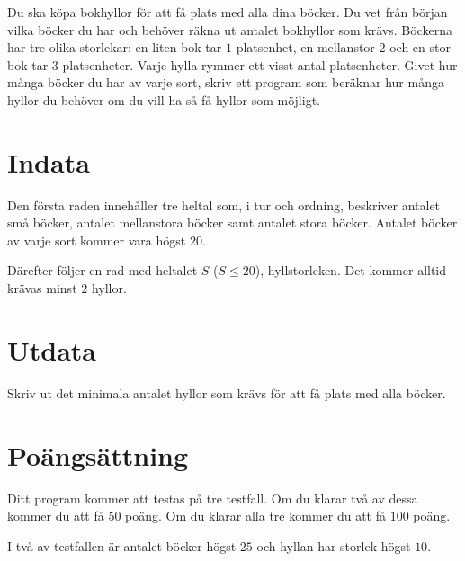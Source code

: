 Du ska köpa bokhyllor för att få plats med alla dina böcker.
Du vet från början vilka böcker du har och behöver räkna ut antalet bokhyllor som krävs.
Böckerna har tre olika storlekar: en liten bok tar $1$ platsenhet, en mellanstor $2$ och en stor bok tar $3$ platsenheter.
Varje hylla rymmer ett visst antal platsenheter.
Givet hur många böcker du har av varje sort, skriv ett program som beräknar hur många hyllor du behöver om du vill ha så få hyllor som möjligt.

\section*{Indata}
Den första raden innehåller tre heltal som, i tur och ordning, beskriver antalet små böcker, antalet mellanstora böcker samt antalet stora böcker.
Antalet böcker av varje sort kommer vara högst $20$.

Därefter följer en rad med heltalet $S$ ($S \le 20$), hyllstorleken.
Det kommer alltid krävas minst $2$ hyllor.

\section*{Utdata}
Skriv ut det minimala antalet hyllor som krävs för att få plats med alla böcker.

\section*{Poängsättning}
Ditt program kommer att testas på tre testfall.
Om du klarar två av dessa kommer du att få $50$ poäng.
Om du klarar alla tre kommer du att få $100$ poäng.

I två av testfallen är antalet böcker högst $25$ och hyllan har storlek högst $10$.
